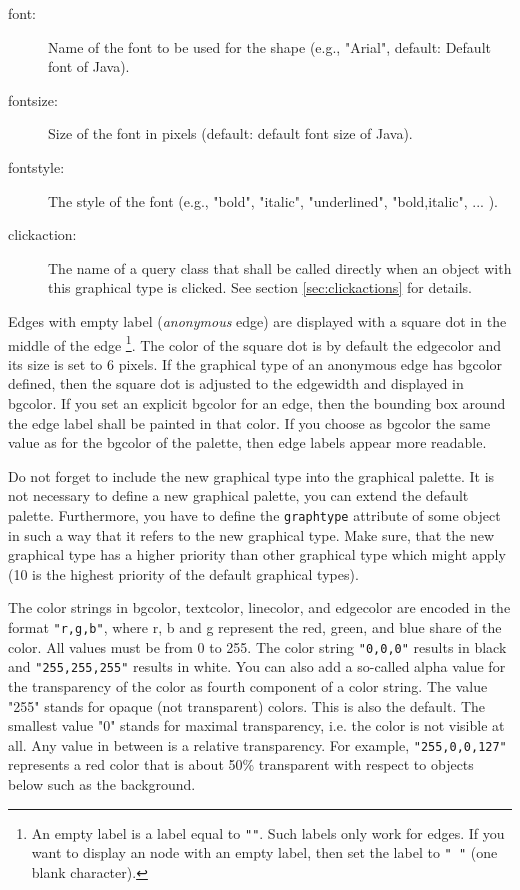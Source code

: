 \begin{description}
\item[font:]
    Name of the font to be used for the shape (e.g., "Arial", default: Default font of Java).

\item[fontsize:]
    Size of the font in pixels (default: default font size of Java).

\item[fontstyle:]
    The style of the font (e.g., "bold", "italic", "underlined", "bold,italic", ... ).

\item[clickaction:]
    The name of a query class that shall be called directly when an object with
    this graphical type is clicked. See section \ref{sec:clickactions} for details.
\end{description}


Edges with empty label ({\em anonymous}\/ edge) are displayed with a square dot in the middle of the edge%
\footnote{An empty label is a label equal to {\tt ""}. Such labels only work for edges.
If you want to display an node with an empty label, then set the label to {\tt " "} (one blank character).}.
The color of the square dot is by default the edgecolor and its size is set to 6 pixels.
If the graphical type of an anonymous edge has bgcolor defined, then the square dot is
adjusted to the edgewidth and displayed in bgcolor. 
If you set an explicit bgcolor for an edge, then the bounding box
around the edge label shall be painted in that color. If you choose as bgcolor
the same value as for the bgcolor of the palette, then edge labels appear
more readable. 

Do not forget to include the new graphical type into the graphical palette.
It is not necessary to define a new graphical palette, you can extend the
default palette. Furthermore, you have to define the {\tt graphtype} attribute
of some object in such a way that it refers to the new graphical type. Make
sure, that the new graphical type has a higher priority than other graphical
type which might apply (10 is the highest priority of the default graphical types).

The color strings in bgcolor, textcolor, linecolor, and edgecolor
are encoded in the format {\tt "r,g,b"}, where r, b and g represent the red,
green, and blue share of the color. All values must be from 0 to 255. The
color string {\tt "0,0,0"} results in black and {\tt "255,255,255"} results in white.
You can also add a so-called alpha value for the transparency of the color as fourth
component of a color string. The value "255" stands for opaque (not transparent) colors.
This is also the default. The smallest value "0" stands for maximal transparency, i.e.
the color is not visible at all. Any value in between is a relative transparency.
For example, {\tt "255,0,0,127"} represents a red color that is about 50\% transparent
with respect to objects below such as the background. 



